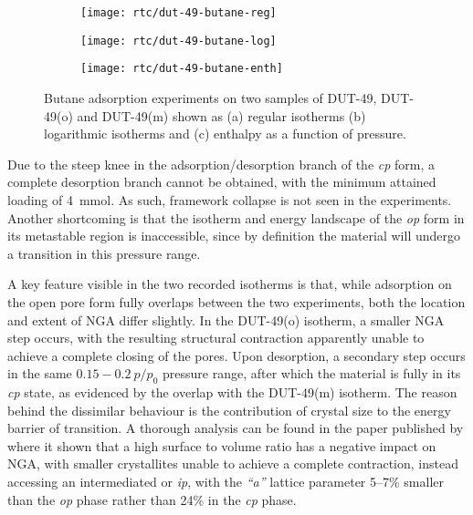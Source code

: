 \begin{figure}[htb]
    \centering
    \begin{subfigure}{0.33\linewidth}
        \texttt{[image: rtc/dut-49-butane-reg]}%
        \caption{}\label{dut:fig:dut-49-butane-reg}
    \end{subfigure}%
    \begin{subfigure}{0.33\linewidth}
        \texttt{[image: rtc/dut-49-butane-log]}%
        \caption{}\label{dut:fig:dut-49-butane-log}
    \end{subfigure}%
    \begin{subfigure}{0.33\linewidth}
        \texttt{[image: rtc/dut-49-butane-enth]}%
        \caption{}\label{dut:fig:dut-49-butane-enth}
    \end{subfigure}%
    \caption{Butane adsorption experiments on two samples of 
    DUT-49, DUT-49(o) and DUT-49(m) shown as (a) regular 
    isotherms (b) logarithmic isotherms 
    and (c) enthalpy as a function of pressure.}%
    \label{dut:fig:dut-49-butane}
\end{figure}

Due to the steep knee in the adsorption/desorption branch of the 
\textit{cp} form, a complete desorption branch cannot be obtained,
with the minimum attained loading of \SI{4}{\milli\mol}. As such,
framework collapse is not seen in the experiments. Another 
shortcoming is that the isotherm
and energy landscape of the \textit{op} form in its metastable 
region is inaccessible, since by definition the material will 
undergo a transition in this pressure range.

A key feature visible in the two recorded isotherms is that,
while adsorption on the open pore form fully overlaps between the 
two experiments, both the location and extent of NGA differ 
slightly. In the DUT-49(o) isotherm, a smaller NGA step occurs,
with the resulting structural contraction apparently unable to 
achieve a complete closing of the pores. Upon desorption, a 
secondary step occurs in the same \(0.15-0.2~p/p_0\) pressure range,
after which the material is fully in its \textit{cp} state,
as evidenced by the overlap with the DUT-49(m) isotherm. The 
reason behind the dissimilar behaviour is the contribution
of crystal size to the energy barrier of transition. A thorough
analysis can be found in the paper published 
by \citet{krauseEffectCrystalliteSize2018} where it shown that 
a high surface to volume ratio has a negative impact on NGA, with 
smaller crystallites unable to achieve a complete contraction,
instead accessing an intermediated or \textit{ip}, with the \textit{``a''}
lattice parameter 5--7\% smaller than the \textit{op} phase
rather than 24\% in the \textit{cp} phase.

